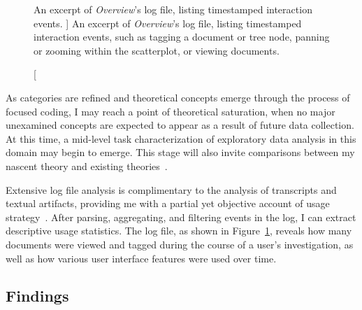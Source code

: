 
\begin{figure}
    \centering
    \caption
    [
        An excerpt of {\it Overview}'s log file, listing timestamped interaction events.
    ]
    {
        An excerpt of {\it Overview}'s log file, listing timestamped interaction events, such as tagging a document or tree node, panning or zooming within the scatterplot, or viewing documents.
    }
    \label{fig:overview_log}
    \centering
\end{figure}


As categories are refined and theoretical concepts emerge through the process of focused coding, I may reach a point of theoretical saturation, when no major unexamined concepts are expected to appear as a result of future data collection. 
At this time, a mid-level task characterization of exploratory data analysis in this domain may begin to emerge. 
This stage will also invite comparisons between my nascent theory and existing theories~\cite{Amar2005,Pirolli2009,Springmeyer1992}.

Extensive log file analysis is complimentary to the analysis of transcripts and textual artifacts, providing me with a partial yet objective account of usage strategy~\cite{Pohl2010}. 
After parsing, aggregating, and filtering events in the log, I can extract descriptive usage statistics. 
The log file, as shown in Figure~\ref{fig:overview_log}, 
reveals how many documents were viewed and tagged during the course of a user's investigation, as well as how various user interface features were used over time.

\subsection{Findings}
\label{app:overview:prelim-findings}

